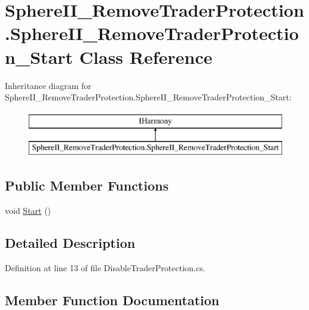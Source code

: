 \hypertarget{class_sphere_i_i___remove_trader_protection_1_1_sphere_i_i___remove_trader_protection___start}{}\section{Sphere\+I\+I\+\_\+\+Remove\+Trader\+Protection.\+Sphere\+I\+I\+\_\+\+Remove\+Trader\+Protection\+\_\+\+Start Class Reference}
\label{class_sphere_i_i___remove_trader_protection_1_1_sphere_i_i___remove_trader_protection___start}
Inheritance diagram for Sphere\+I\+I\+\_\+\+Remove\+Trader\+Protection.\+Sphere\+I\+I\+\_\+\+Remove\+Trader\+Protection\+\_\+\+Start\+:\begin{figure}[H]
\begin{center}
\leavevmode
\includegraphics[height=2.000000cm]{class_sphere_i_i___remove_trader_protection_1_1_sphere_i_i___remove_trader_protection___start}
\end{center}
\end{figure}
\subsection*{Public Member Functions}
\begin{DoxyCompactItemize}
\item 
void \mbox{\hyperlink{class_sphere_i_i___remove_trader_protection_1_1_sphere_i_i___remove_trader_protection___start_a9be164eec70f59a759562569cb822a31}{Start}} ()
\end{DoxyCompactItemize}


\subsection{Detailed Description}


Definition at line 13 of file Disable\+Trader\+Protection.\+cs.



\subsection{Member Function Documentation}
\mbox{\label{class_sphere_i_i___remove_trader_protection_1_1_sphere_i_i___remove_trader_protection___start_a9be164eec70f59a759562569cb822a31}} 
